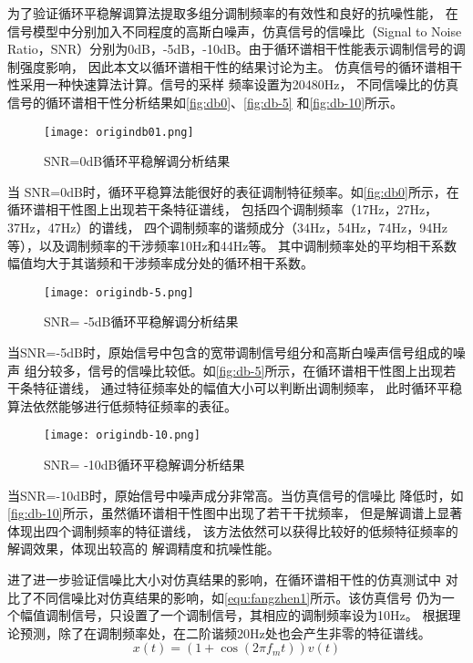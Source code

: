 为了验证循环平稳解调算法提取多组分调制频率的有效性和良好的抗噪性能，
在信号模型中分别加入不同程度的高斯白噪声，仿真信号的信噪比（Signal to Noise 
Ratio，SNR）分别为0dB，-5dB，-10dB。由于循环谱相干性能表示调制信号的调制强度影响，
因此本文以循环谱相干性的结果讨论为主。
仿真信号的循环谱相干性采用一种快速算法计算\cite{antoniFastComputationSpectral2017}。信号的采样
频率设置为20480Hz，
不同信噪比的仿真信号的循环谱相干性分析结果如\autoref{fig:db0}、\autoref{fig:db-5}
和\autoref{fig:db-10}所示。
\begin{figure}[htbp]
    \centering
    \texttt{[image: origindb01.png]}
    \caption{\label{fig:db0}SNR=0dB循环平稳解调分析结果}
\end{figure}

当 SNR=0dB时，循环平稳算法能很好的表征调制特征频率。如\autoref{fig:db0}所示，在循环谱相干性图上出现若干条特征谱线，
包括四个调制频率（17Hz，27Hz，37Hz，47Hz）的谱线，
四个调制频率的谐频成分（34Hz，54Hz，74Hz，94Hz等），以及调制频率的干涉频率10Hz和44Hz等。
其中调制频率处的平均相干系数幅值均大于其谐频和干涉频率成分处的循环相干系数。
\begin{figure}[htbp]
    \centering
    \texttt{[image: origindb-5.png]}
    \caption{\label{fig:db-5}SNR= -5dB循环平稳解调分析结果}
\end{figure}

当SNR=-5dB时，原始信号中包含的宽带调制信号组分和高斯白噪声信号组成的噪声
组分较多，信号的信噪比较低。如\autoref{fig:db-5}所示，在循环谱相干性图上出现若干条特征谱线，
通过特征频率处的幅值大小可以判断出调制频率，
此时循环平稳算法依然能够进行低频特征频率的表征。

\begin{figure}[htbp]
    \centering
    \texttt{[image: origindb-10.png]}
    \caption{\label{fig:db-10}SNR= -10dB循环平稳解调分析结果}
\end{figure}

当SNR=-10dB时，原始信号中噪声成分非常高。当仿真信号的信噪比
降低时，如\autoref{fig:db-10}所示，虽然循环谱相干性图中出现了若干干扰频率，
但是解调谱上显著体现出四个调制频率的特征谱线，
该方法依然可以获得比较好的低频特征频率的解调效果，体现出较高的
解调精度和抗噪性能。

进了进一步验证信噪比大小对仿真结果的影响，在循环谱相干性的仿真测试中
对比了不同信噪比对仿真结果的影响，如\autoref{equ:fangzhen1}所示。该仿真信号
仍为一个幅值调制信号，只设置了一个调制信号，其相应的调制频率设为10Hz。
根据理论预测，除了在调制频率处，在二阶谐频20Hz处也会产生非零的特征谱线。
\begin{equation}
    \label{equ:fangzhen1}
    x\left ( t \right ) =\left ( 1+\cos \left ( 2\pi f_mt \right )  \right ) v\left ( t \right ) 
\end{equation}

